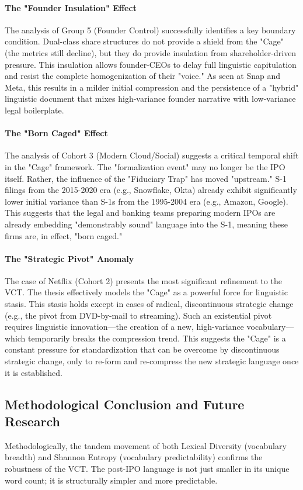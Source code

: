 \documentclass[12pt, letterpaper]{article}
\begin{document}
\paragraph{The "Founder Insulation" Effect} The analysis of Group 5 (Founder Control) successfully identifies a key boundary condition. Dual-class share structures do not provide a shield from the "Cage" (the metrics still decline), but they do provide insulation from shareholder-driven pressure. This insulation allows founder-CEOs to delay full linguistic capitulation and resist the complete homogenization of their "voice." As seen at Snap and Meta, this results in a milder initial compression and the persistence of a "hybrid" linguistic document that mixes high-variance founder narrative with low-variance legal boilerplate.

\paragraph{The "Born Caged" Effect} The analysis of Cohort 3 (Modern Cloud/Social) suggests a critical temporal shift in the "Cage" framework. The "formalization event" may no longer be the IPO itself. Rather, the influence of the "Fiduciary Trap" has moved "upstream." S-1 filings from the 2015-2020 era (e.g., Snowflake, Okta) already exhibit significantly lower initial variance than S-1s from the 1995-2004 era (e.g., Amazon, Google). This suggests that the legal and banking teams preparing modern IPOs are already embedding "demonstrably sound" language into the S-1, meaning these firms are, in effect, "born caged."

\paragraph{The "Strategic Pivot" Anomaly} The case of Netflix (Cohort 2) presents the most significant refinement to the VCT. The thesis effectively models the "Cage" as a powerful force for linguistic stasis. This stasis holds except in cases of radical, discontinuous strategic change (e.g., the pivot from DVD-by-mail to streaming). Such an existential pivot requires linguistic innovation—the creation of a new, high-variance vocabulary—which temporarily breaks the compression trend. This suggests the "Cage" is a constant pressure for standardization that can be overcome by discontinuous strategic change, only to re-form and re-compress the new strategic language once it is established.

\subsection{Methodological Conclusion and Future Research}
Methodologically, the tandem movement of both Lexical Diversity (vocabulary breadth) and Shannon Entropy (vocabulary predictability) confirms the robustness of the VCT. The post-IPO language is not just smaller in its unique word count; it is structurally simpler and more predictable.
\end{document}
